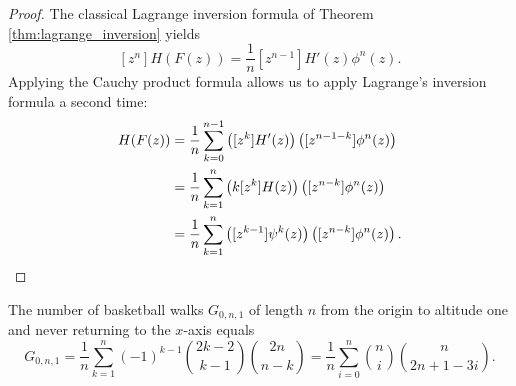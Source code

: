 \begin{proof}
  The classical Lagrange inversion formula of Theorem \ref{thm:lagrange_inversion} yields
  $$
  [z^{n}]H(F(z)) = \frac{1}{n}[z^{n-1}]H'(z)\phi^{n}(z).
  $$
  Applying the Cauchy product formula allows us to apply Lagrange's inversion formula a second time:
  \begin{align*}
    [z^{n}]H(F(z)) &= 
    \frac{1}{n}\sum_{k=0}^{n-1}
    \left(
      [z^{k}]H'(z)
    \right)
    \left(
      [z^{n-1-k}]\phi^{n}(z)
    \right) \\
    &= \frac{1}{n}\sum_{k=1}^{n}
    \left(
      k[z^{k}]H(z)
    \right)
    \left(
      [z^{n-k}]\phi^{n}(z)
    \right) \\
    &= \frac{1}{n}\sum_{k=1}^{n}
    \left(
      [z^{k-1}]\psi^{k}(z)
    \right)
    \left(
      [z^{n-k}]\phi^{n}(z)
    \right). \qedhere
  \end{align*}
\end{proof}

\begin{proposition}
  The number of basketball walks $G_{0,n,1}$ of length $n$ from the origin to altitude one and never returning to the $x$-axis equals
  $$
    G_{0,n,1} = \frac{1}{n}\sum_{k=1}^{n}(-1)^{k-1}\binom{2k-2}{k-1}\binom{2n}{n-k} =
    \frac{1}{n}\sum_{i=0}^{n}\binom{n}{i}\binom{n}{2n+1-3i}.
  $$
\end{proposition}

